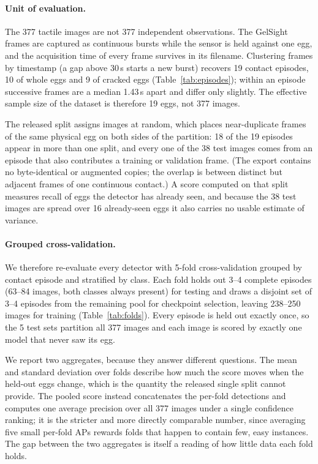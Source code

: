 \paragraph{Unit of evaluation.} The 377 tactile images are not 377 independent observations.
The GelSight frames are captured as continuous bursts while the sensor is held against one
egg, and the acquisition time of every frame survives in its filename. Clustering frames by
timestamp (a gap above 30\,s starts a new burst) recovers 19 contact episodes, 10 of whole
eggs and 9 of cracked eggs (Table~\ref{tab:episodes}); within an episode successive frames
are a median 1.43\,s apart and differ only slightly. The effective sample size of the
dataset is therefore 19 eggs, not 377 images.

The released split assigns images at random, which places near-duplicate frames of the same
physical egg on both sides of the partition: 18 of the 19 episodes appear in more than one
split, and every one of the 38 test images comes from an episode that also contributes a
training or validation frame. (The export contains no byte-identical or augmented copies;
the overlap is between distinct but adjacent frames of one continuous contact.) A score
computed on that split measures recall of eggs the detector has already seen, and because
the 38 test images are spread over 16 already-seen eggs it also carries no usable estimate
of variance.

\paragraph{Grouped cross-validation.} We therefore re-evaluate every detector with 5-fold
cross-validation grouped by contact episode and stratified by class. Each fold holds out
3--4 complete episodes (63--84 images, both classes always present) for testing and draws a
disjoint set of 3--4 episodes from the remaining pool for checkpoint selection, leaving
238--250 images for training (Table~\ref{tab:folds}). Every episode is held out exactly
once, so the 5 test sets partition all 377 images and each image is scored by exactly one
model that never saw its egg.

We report two aggregates, because they answer different questions. The mean and standard
deviation over folds describe how much the score moves when the held-out eggs change, which
is the quantity the released single split cannot provide. The pooled score instead
concatenates the per-fold detections and computes one average precision over all 377 images
under a single confidence ranking; it is the stricter and more directly comparable number,
since averaging five small per-fold APs rewards folds that happen to contain few, easy
instances. The gap between the two aggregates is itself a reading of how little data each
fold holds.


